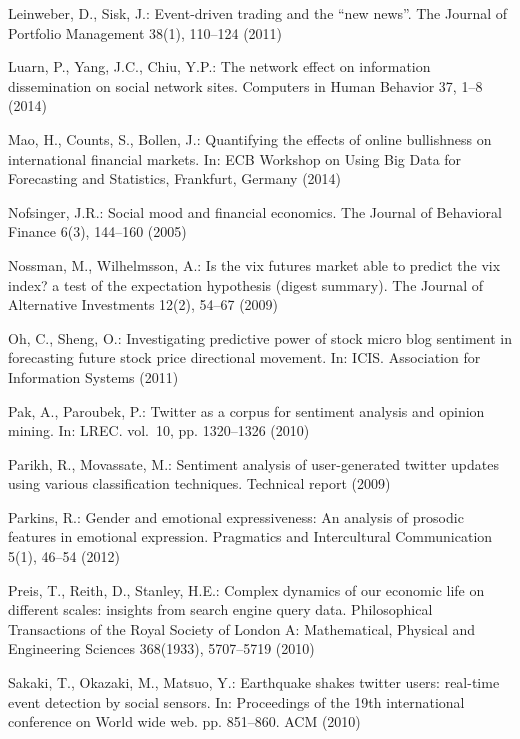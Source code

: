 \documentclass[aps,preprint,groupedaddress]{revtex4-1}
\begin{document}
\begin{thebibliography}{10}
Leinweber, D., Sisk, J.: Event-driven trading and the “new news”. The
  Journal of Portfolio Management  38(1),  110--124 (2011)

Luarn, P., Yang, J.C., Chiu, Y.P.: The network effect on information
  dissemination on social network sites. Computers in Human Behavior  37,  1--8
  (2014)

Mao, H., Counts, S., Bollen, J.: Quantifying the effects of online bullishness
  on international financial markets. In: ECB Workshop on Using Big Data for
  Forecasting and Statistics, Frankfurt, Germany (2014)

Nofsinger, J.R.: Social mood and financial economics. The Journal of Behavioral
  Finance  6(3),  144--160 (2005)

Nossman, M., Wilhelmsson, A.: Is the vix futures market able to predict the vix
  index? a test of the expectation hypothesis (digest summary). The Journal of
  Alternative Investments  12(2),  54--67 (2009)

Oh, C., Sheng, O.: Investigating predictive power of stock micro blog sentiment
  in forecasting future stock price directional movement. In: ICIS. Association
  for Information Systems (2011)

Pak, A., Paroubek, P.: Twitter as a corpus for sentiment analysis and opinion
  mining. In: LREC. vol.~10, pp. 1320--1326 (2010)

Parikh, R., Movassate, M.: Sentiment analysis of user-generated twitter updates
  using various classification techniques. Technical report  (2009)

Parkins, R.: Gender and emotional expressiveness: An analysis of prosodic
  features in emotional expression. Pragmatics and Intercultural Communication
  5(1),  46--54 (2012)

Preis, T., Reith, D., Stanley, H.E.: Complex dynamics of our economic life on
  different scales: insights from search engine query data. Philosophical
  Transactions of the Royal Society of London A: Mathematical, Physical and
  Engineering Sciences  368(1933),  5707--5719 (2010)

Sakaki, T., Okazaki, M., Matsuo, Y.: Earthquake shakes twitter users: real-time
  event detection by social sensors. In: Proceedings of the 19th international
  conference on World wide web. pp. 851--860. ACM (2010)


\end{thebibliography}
\end{document}
